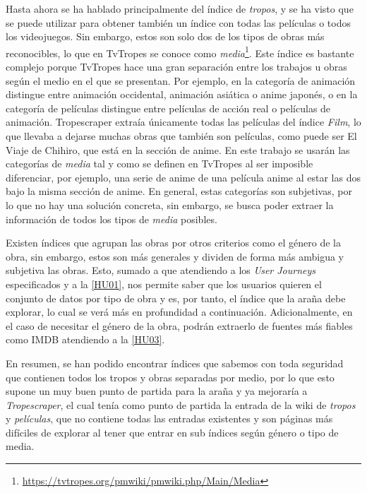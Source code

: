 Hasta ahora se ha hablado principalmente del índice de \textit{tropos}, y se ha
visto que se puede utilizar para obtener también un índice con todas las
películas o todos los videojuegos. Sin embargo, estos son solo dos de los tipos
de obras más reconocibles, lo que en TvTropes se conoce como
\textit{media}\footnote{\url{https://tvtropes.org/pmwiki/pmwiki.php/Main/Media}}.
Este índice es bastante complejo porque TvTropes hace una gran separación entre
los trabajos u obras según el medio en el que se presentan. Por ejemplo, en la
categoría de animación distingue entre animación occidental, animación asiática
o anime japonés, o en la categoría de películas distingue entre películas de
acción real o películas de animación. Tropescraper extraía únicamente todas las
películas del índice \textit{Film}, lo que llevaba a dejarse muchas obras que
también son películas, como puede ser El Viaje de Chihiro, que está en la
sección de anime. En este trabajo se usarán las categorías de \textit{media} tal
y como se definen en TvTropes al ser imposible diferenciar, por ejemplo, una
serie de anime de una película anime al estar las dos bajo la misma sección de
anime. En general, estas categorías son subjetivas, por lo que no hay una
solución concreta, sin embargo, se busca poder extraer la información de todos
los tipos de \textit{media} posibles.

Existen índices que agrupan las obras por otros criterios como el género de la
obra, sin embargo, estos son más generales y dividen de forma más ambigua y
subjetiva las obras. Esto, sumado a que atendiendo a los \textit{User Journeys}
especificados y a la
\href{https://github.com/jlgallego99/TropesToGo/issues/6}{[HU01]}, nos permite
saber que los usuarios quieren el conjunto de datos por tipo de obra y es, por
tanto, el índice que la araña debe explorar, lo cual se verá más en profundidad
a continuación. Adicionalmente, en el caso de necesitar el género de la obra,
podrán extraerlo de fuentes más fiables como IMDB atendiendo a la
\href{https://github.com/jlgallego99/TropesToGo/issues/8}{[HU03]}.

En resumen, se han podido encontrar índices que sabemos con toda seguridad que
contienen todos los tropos y obras separadas por medio, por lo que esto supone
un muy buen punto de partida para la araña y ya mejoraría a
\textit{Tropescraper}, el cual tenía como punto de partida la entrada de la wiki
de \textit{tropos} y \textit{películas}, que no contiene todas las entradas
existentes y son páginas más difíciles de explorar al tener que entrar en sub
índices según género o tipo de media.

